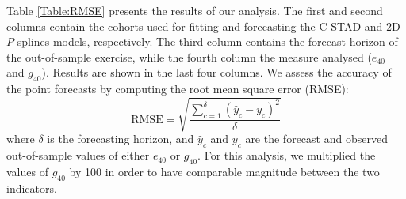 \documentclass[11pt, a4paper]{article}
\begin{document}
Table \ref{Table:RMSE} presents the results of our analysis. The first and second columns contain the cohorts used for fitting and forecasting the C-STAD and 2D $P$-splines models, respectively. The third column contains the forecast horizon of the out-of-sample exercise, while the fourth column the measure analysed ($e_{40}$ and $g_{40}$). Results are shown in the last four columns. We assess the accuracy of the point forecasts by computing the root mean square error (RMSE):
\begin{equation}\label{Eq:RMSE}
\mathrm{RMSE}=\sqrt{\frac{ \sum_{c=1}^{\delta} \left(\hat{y}_c-y_c\right)^2}{\delta}}
\end{equation} 
where $\delta$ is the forecasting horizon, and $\hat{y}_c$ and $y_c$ are the forecast and observed out-of-sample values of either $e_{40}$ or $g_{40}$. For this analysis, we multiplied the values of $g_{40}$ by 100 in order to have comparable magnitude between the two indicators. \par 


\end{document}
